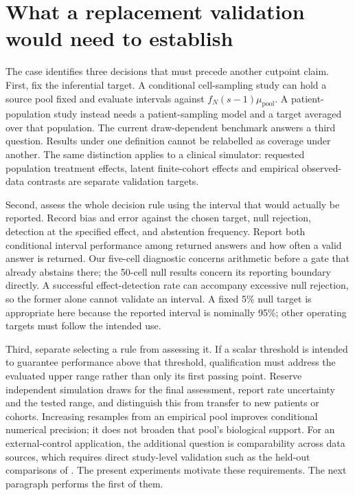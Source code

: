 \section{What a replacement validation would need to establish}
\label{sec:validation}

The case identifies three decisions that must precede another cutpoint claim.
First, fix the inferential target. A conditional cell-sampling study can hold a
source pool fixed and evaluate intervals against $f_N(s-1)\mu_{\mathrm{pool}}$.
A patient-population study instead needs a patient-sampling model and a target
averaged over that population. The current draw-dependent benchmark answers a
third question. Results under one definition cannot be relabelled as coverage
under another. The same distinction applies to a clinical simulator: requested
population treatment effects, latent finite-cohort effects and empirical
observed-data contrasts are separate validation targets.

Second, assess the whole decision rule using the interval that would actually
be reported. Record bias and error against the chosen target, null rejection,
detection at the specified effect, and abstention frequency. Report both
conditional interval performance among returned answers and how often a valid
answer is returned. Our five-cell diagnostic concerns arithmetic before a gate
that already abstains there; the 50-cell null results concern its reporting
boundary directly. A successful effect-detection rate can accompany excessive
null rejection, so the former alone cannot validate an interval. A fixed
5\% null target is appropriate here because the reported interval is nominally
95\%; other operating targets must follow the intended use.

Third, separate selecting a rule from assessing it. If a scalar threshold is
intended to guarantee performance above that threshold, qualification must
address the evaluated upper range rather than only its first passing point.
Reserve independent simulation draws for the final assessment, report rate
uncertainty and the tested range, and distinguish this from transfer to new
patients or cohorts. Increasing resamples from an empirical pool improves
conditional numerical precision; it does not broaden that pool's biological
support. For an external-control application, the additional question is
comparability across data sources, which requires direct study-level validation
such as the held-out comparisons of \citet{ventz2019}. The present experiments
motivate these requirements. The next paragraph performs the first of them.

